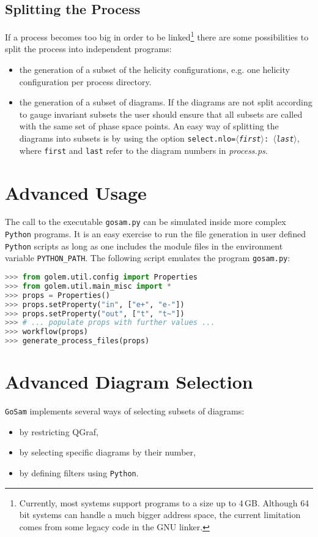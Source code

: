 \documentclass[11pt,a4paper]{refrep}
\newcommand{\golemversion}{{1{.}0}}
\newcommand{\golemv}[1][\golemversion]{{\tt GoSam}\xspace}
\newcommand{\python}{{\tt Python}\xspace}
\begin{document}
\subsection{Splitting the Process}
If a process becomes too big in order to be linked\footnote{
Currently, most systems support programs to a size up to 4\,GB.
Although 64\,bit systems can handle a much bigger address space,
the current limitation comes from some legacy code in the GNU linker.}
there are some possibilities to split the process into independent
programs:
\begin{itemize}
\item the generation of a subset of the helicity configurations, 
e.g. one helicity configuration
      per process directory.
\item the generation of a subset of diagrams. If the diagrams are not
      split according to gauge invariant subsets the user should ensure
      that all subsets are called with the same set of phase space points.
      An easy way of splitting the diagrams into subsets is by using
      the option \texttt{select.nlo=\textit{$\langle$first$\rangle$}:\textit{%
       $\langle$last$\rangle$}}, where \texttt{first} and \texttt{last} refer to the 
       diagram numbers in {\em process.ps}.
\end{itemize}

\section{Advanced Usage}
The call to the executable \texttt{gosam.py} can be simulated
inside more complex \python programs.
It is an easy exercise to
run the file generation in user defined \python scripts as long as
one includes the module files in the environment variable
\texttt{PYTHON\_PATH}. The following script emulates the
program \texttt{gosam.py}:
\begin{lstlisting}[language=python]
>>> from golem.util.config import Properties
>>> from golem.util.main_misc import *
>>> props = Properties()
>>> props.setProperty("in", ["e+", "e-"])
>>> props.setProperty("out", ["t", "t~"])
>>> # ... populate props with further values ...
>>> workflow(props)
>>> generate_process_files(props)
\end{lstlisting}

\section{Advanced Diagram Selection}
\golemv implements several ways of selecting subsets of diagrams:
\begin{itemize}
\item by restricting QGraf,
\item by selecting specific diagrams by their number,
\item by defining filters using \python.
\end{itemize}
\end{document}
